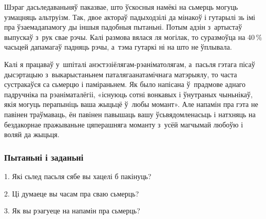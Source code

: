 Шэраг дасьледаваньняў паказвае, што ўскосныя намёкі на сьмерць могуць узмацняць альтруізм. Так, двое актораў падыходзілі да мінакоў і гутарылі зь імі пра ўзаемадапамогу ды іншыя падобныя пытаньні. Потым адзін з~артыстаў выпускаў з~рук свае рэчы. Калі размова вялася ля могілак, то суразмоўца на 40\,\% часьцей дапамагаў падняць рэчы, а~тэма гутаркі ні на што не ўплывала.

Калі я працаваў у~шпіталі анэстэзіёлягам-рэаніматолягам, а~пасьля гэтага пісаў дысэртацыю з~выкарыстаньнем паталягаанатамічнага матэрыялу, то часта сустракаўся са сьмерцю і паміраньнем. Як было напісана ў~прадмове аднаго падручніка па рэаніматалёгіі, «існуюць сотні вонкавых і ўнутраных чыньнікаў, якія могуць перапыніць ваша жыцьцё ў~любы момант». Але напамін пра гэта не павінен траўмаваць, ён павінен павышаць вашу ўсьвядомленасьць і натхняць на бездакорнае пражываньне цяперашняга моманту з~усёй магчымай любоўю і воляй да жыцьця.

\subsubsection{Пытаньні і заданьні}

1. Які сьлед пасьля сябе вы хацелі б пакінуць?

2. Ці думаеце вы часам пра сваю сьмерць?

3. Як вы рэагуеце на напамін пра сьмерць?

